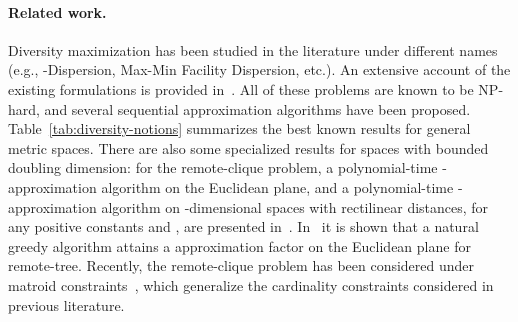 \documentclass{article}
\begin{document}
\iffalse More specifically, in the
Streaming model we have a single processor with memory space that is
significantly smaller than the total size of the data stream, while,
in MapReduce, the local memory of each reducer (processor) is
polynomially sublinear in the total data size. An obvious question is
how this limitations affect the quality of the approximation for the
various diversity problems. In this work, we provide an answer to this
question, focusing on the case of metric spaces of bounded doubling
dimension, a class of metric spaces that has attracted significant
interest in the context of data analysis, and that includes the
important family of Euclidean spaces of constant dimension.  
\fi



\paragraph{Related work.}
\sloppy
Diversity maximization has been studied in the literature under
different names (e.g., -Dispersion, Max-Min Facility Dispersion,
etc.).  An extensive account of the existing formulations is provided
in~\cite{ChandraH01}. All of these problems are known to be NP-hard,
and several sequential approximation algorithms have been proposed.
Table~\ref{tab:diversity-notions} summarizes the best known results
for general metric spaces.  There are also some specialized results
for spaces with bounded doubling dimension: for the remote-clique
problem, a polynomial-time -approximation
algorithm on the Euclidean plane, and a polynomial-time
-approximation algorithm on -dimensional spaces with
rectilinear distances, for any positive constants  and
, are presented in~\cite{FeketeM04}.  In~\cite{HalldorssonIKT99} it
is shown that a natural greedy algorithm attains a 
approximation factor on the Euclidean plane for remote-tree. Recently,
the remote-clique problem has been considered under matroid
constraints~\cite{AbbassiMT13,CevallosEZ16}, which generalize the
cardinality constraints considered in previous literature.
\end{document}
